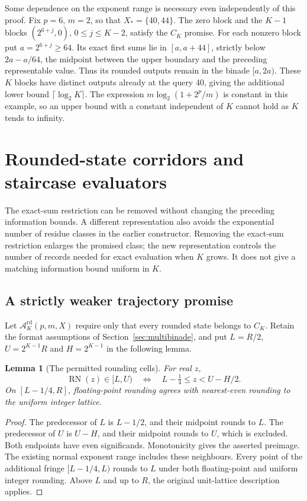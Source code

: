 \documentclass[11pt,reqno]{amsart}
\newtheorem{lemma}[theorem]{Lemma}
\theoremstyle{definition}
\theoremstyle{remark}
\numberwithin{equation}{section}
\DeclareMathOperator{\RN}{RN}
\begin{document}
Some dependence on the exponent range is necessary even independently of
this proof. Fix $p=6$, $m=2$, so that $X_\ast=\{40,44\}$. The zero block
and the $K-1$ blocks $(2^{6+j},0)$, $0\leq j\leq K-2$, satisfy the
$C_K$ promise. For each nonzero block put $a=2^{6+j}\geq64$. Its exact
first sums lie in $[a,a+44]$, strictly below $2a-a/64$, the midpoint
between the upper boundary and the preceding representable value.
Thus its rounded outputs remain in the binade $[a,2a)$. These $K$ blocks
have distinct outputs already at the query 40, giving the additional
lower bound $\lceil\log_2 K\rceil$. The expression
$m\log_2(1+2^p/m)$ is constant in this example, so an upper bound with
a constant independent of $K$ cannot hold as $K$ tends to infinity.

\section{Rounded-state corridors and staircase evaluators}
\label{sec:staircase}

The exact-sum restriction can be removed without changing the preceding
information bounds. A different representation also avoids the exponential
number of residue classes in the earlier constructor. Removing the exact-sum restriction
enlarges the promised class; the new representation controls the number
of records needed for exact evaluation when $K$ grows. It does not give a matching information bound uniform in $K$.

\subsection{A strictly weaker trajectory promise}

Let $\mathcal A_K^{\mathrm{rd}}(p,m,X)$ require only that every rounded
state belongs to $C_K$. Retain the format assumptions of
Section~\ref{sec:multibinade}, and put $L=R/2$, $U=2^{K-1}R$ and
$H=2^{K-1}$ in the following lemma.

\begin{lemma}[The permitted rounding cells]\label{lem:rounding-fringe}
For real $z$,
\[
 \RN(z)\in[L,U)
 \quad\Longleftrightarrow\quad L-\tfrac14\leq z<U-H/2.
\]
On $[L-1/4,R]$, floating-point rounding agrees with nearest-even rounding
to the uniform integer lattice.
\end{lemma}

\begin{proof}
The predecessor of $L$ is $L-1/2$, and their midpoint rounds to $L$.
The predecessor of $U$ is $U-H$, and their midpoint rounds to $U$, which
is excluded. Both endpoints have even significands. Monotonicity gives
the asserted preimage. The existing normal exponent range includes these
neighbours. Every point of the additional fringe $[L-1/4,L)$ rounds to
$L$ under both floating-point and uniform integer rounding. Above $L$
and up to $R$, the original unit-lattice description applies.
\end{proof}
\end{document}
